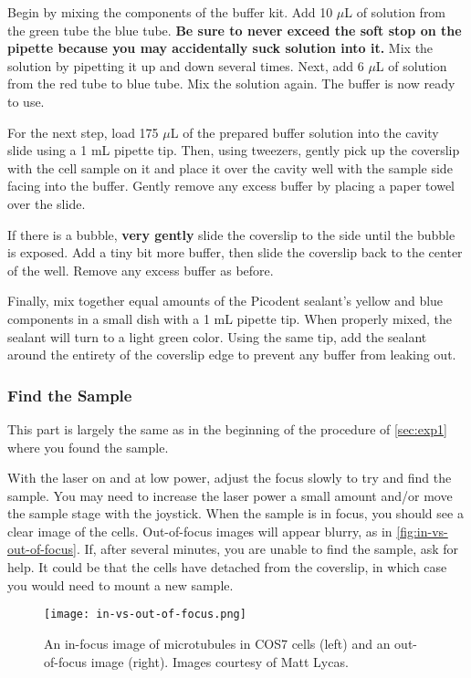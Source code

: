 \documentclass[10pt,a4paper,oneside]{book}
\begin{document}
Begin by mixing the components of the buffer kit. Add 10 $\mu$L of solution from the green tube the blue tube. \textbf{Be sure to never exceed the soft stop on the pipette because you may accidentally suck solution into it.} Mix the solution by pipetting it up and down several times. Next, add 6 $\mu$L of solution from the red tube to blue tube. Mix the solution again. The buffer is now ready to use.

For the next step, load 175 $\mu$L of the prepared buffer solution into the cavity slide using a 1 mL pipette tip. Then, using tweezers, gently pick up the coverslip with the cell sample on it and place it over the cavity well with the sample side facing into the buffer. Gently remove any excess buffer by placing a paper towel over the slide.

If there is a bubble, \textbf{very gently} slide the coverslip to the side until the bubble is exposed. Add a tiny bit more buffer, then slide the coverslip back to the center of the well. Remove any excess buffer as before.

Finally, mix together equal amounts of the Picodent sealant's yellow and blue components in a small dish with a 1 mL pipette tip. When properly mixed, the sealant will turn to a light green color. Using the same tip, add the sealant around the entirety of the coverslip edge to prevent any buffer from leaking out.

\subsubsection{Find the Sample}

This part is largely the same as in the beginning of the procedure of \autoref{sec:exp1} where you found the sample.

With the laser on and at low power, adjust the focus slowly to try and find the sample. You may need to increase the laser power a small amount and/or move the sample stage with the joystick. When the sample is in focus, you should see a clear image of the cells. Out-of-focus images will appear blurry, as in \autoref{fig:in-vs-out-of-focus}. If, after several minutes, you are unable to find the sample, ask for help. It could be that the cells have detached from the coverslip, in which case you would need to mount a new sample.

\begin{figure}[ht]
    \centering
    \texttt{[image: in-vs-out-of-focus.png]}
    \caption{An in-focus image of microtubules in COS7 cells (left) and an out-of-focus image (right). Images courtesy of Matt Lycas.}
    \label{fig:in-vs-out-of-focus}
\end{figure}
\end{document}
